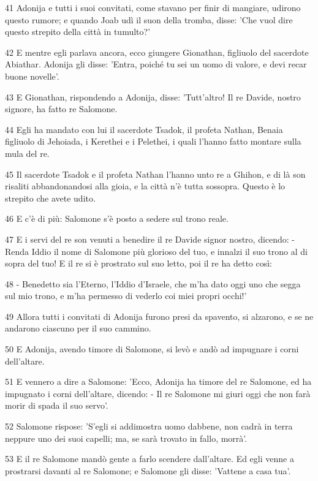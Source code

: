 \par 41 Adonija e tutti i suoi convitati, come stavano per finir di mangiare, udirono questo rumore; e quando Joab udì il suon della tromba, disse: 'Che vuol dire questo strepito della città in tumulto?'
\par 42 E mentre egli parlava ancora, ecco giungere Gionathan, figliuolo del sacerdote Abiathar. Adonija gli disse: 'Entra, poiché tu sei un uomo di valore, e devi recar buone novelle'.
\par 43 E Gionathan, rispondendo a Adonija, disse: 'Tutt'altro! Il re Davide, nostro signore, ha fatto re Salomone.
\par 44 Egli ha mandato con lui il sacerdote Tsadok, il profeta Nathan, Benaia figliuolo di Jehoiada, i Kerethei e i Pelethei, i quali l'hanno fatto montare sulla mula del re.
\par 45 Il sacerdote Tsadok e il profeta Nathan l'hanno unto re a Ghihon, e di là son risaliti abbandonandosi alla gioia, e la città n'è tutta sossopra. Questo è lo strepito che avete udito.
\par 46 E c'è di più: Salomone s'è posto a sedere sul trono reale.
\par 47 E i servi del re son venuti a benedire il re Davide signor nostro, dicendo: - Renda Iddio il nome di Salomone più glorioso del tuo, e innalzi il suo trono al di sopra del tuo! E il re si è prostrato sul suo letto, poi il re ha detto così:
\par 48 - Benedetto sia l'Eterno, l'Iddio d'Israele, che m'ha dato oggi uno che segga sul mio trono, e m'ha permesso di vederlo coi miei propri occhi!'
\par 49 Allora tutti i convitati di Adonija furono presi da spavento, si alzarono, e se ne andarono ciascuno per il suo cammino.
\par 50 E Adonija, avendo timore di Salomone, si levò e andò ad impugnare i corni dell'altare.
\par 51 E vennero a dire a Salomone: 'Ecco, Adonija ha timore del re Salomone, ed ha impugnato i corni dell'altare, dicendo: - Il re Salomone mi giuri oggi che non farà morir di spada il suo servo'.
\par 52 Salomone rispose: 'S'egli si addimostra uomo dabbene, non cadrà in terra neppure uno dei suoi capelli; ma, se sarà trovato in fallo, morrà'.
\par 53 E il re Salomone mandò gente a farlo scendere dall'altare. Ed egli venne a prostrarsi davanti al re Salomone; e Salomone gli disse: 'Vattene a casa tua'.

